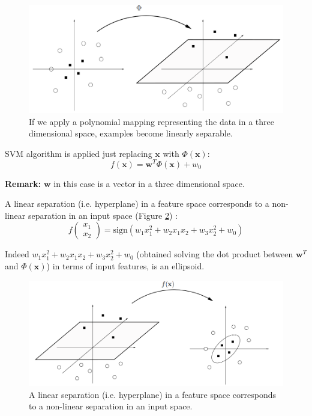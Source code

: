 \begin{figure}[H]
	\centering
	\includegraphics[width=\textwidth]{
		images/14_NonLinearSVMs_polynomialMapping.png
	}
	\caption{If we apply a polynomial mapping representing the data in a three
	dimensional space, examples become linearly separable.}
	\label{fig:example_polinomial_mapping}
\end{figure}

SVM algorithm is applied just replacing $\pmb{x}$ with $\Phi(\pmb{x})$:
\begin{equation}
	f(\pmb{x}) = \pmb{w}^{T}\Phi(\pmb{x}) + w_{0}
\end{equation}

\textbf{Remark:} $\pmb{w}$ in this case is a vector in a three dimensional space.
\newline

A linear separation (i.e. hyperplane) in a feature space corresponds to a non-linear
separation in an input space (Figure \ref{fig:fromHighToLowSpace}) :
\[
	f(
	\begin{matrix}
		x_{1} \\
		x_{2}
	\end{matrix}) = \text{sign}(w_{1}x_{1}^{2}+ w_{2}x_{1}x_{2}+ w_{3}x_{2}^{2}+ w_{0}
	)
\]

Indeed $w_{1}x_{1}^{2}+ w_{2}x_{1}x_{2}+ w_{3}x_{2}^{2}+ w_{0}$ (obtained solving
the dot product between $\pmb{w}^{T}$ and $\Phi(\pmb{x})$) in terms of input
features, is an ellipsoid.
\newline

\begin{figure}[H]
	\centering
	\includegraphics[width=\textwidth]{
		images/14_NonLinearSVMs_fromHighToLowSpace.png
	}
	\caption{A linear separation (i.e. hyperplane) in a feature space corresponds to
	a non-linear separation in an input space.}
	\label{fig:fromHighToLowSpace}
\end{figure}

